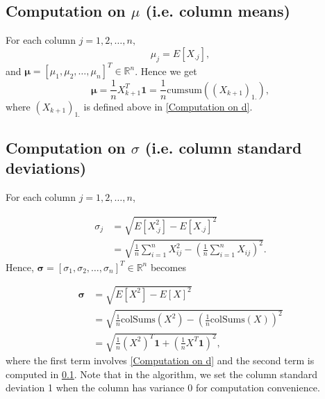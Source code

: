 \subsection{Computation on $\mu$ (i.e. column means)} \label{Computation on cm}
For each column $j= 1,2,\dots,n,$
\begin{equation}
    \mu_j = E[X_{.j}],
\end{equation}
and $\bm{\mu} = [\mu_1, \mu_2, \dots, \mu_n]^T \in \mathbb{R}^n$. Hence we get 
\begin{equation}
 \bm{\mu} = \frac{1}{n} X_{k+1}^T \bm{1} = \frac{1}{n} \text{cumsum}((X_{k+1})_{1.}),
\end{equation}
where $(X_{k+1})_{1.}$ is defined above in \ref{Computation on d}. 

\subsection{Computation on $\sigma$ (i.e. column standard deviations)} \label{Computation on csd}
For each column $j=1,2,\dots, n$,

\begin{align}
\sigma_j & = \sqrt{E[X_{.j}^2] - E[X_{.j}]^2} \\
       & = \sqrt{\frac{1}{n}\sum_{i=1}^{n}X_{ij}^2 - (\frac{1}{n}\sum_{i=1}^{n} X_{ij})^2}.
\end{align}
Hence, $\bm{\sigma} = [\sigma_1, \sigma_2, \dots, \sigma_n]^T \in \mathbb{R}^n$ becomes

\begin{align}
\bm{\sigma} & = \sqrt{E[X^2] - E[X]^2} \\
       & = \sqrt{\frac{1}{n}\text{colSums}(X^2) - (\frac{1}{n}\text{colSums}(X))^2} \\
       & = \sqrt{\frac{1}{n}(X^2)^T \bm{1} + (\frac{1}{n} X^T \bm{1})^2},
\end{align}
where the first term involves \ref{Computation on d} and the second term is computed in \ref{Computation on cm}. Note that in the algorithm, we set the column standard deviation 1 when the column has variance 0 for computation convenience. 

